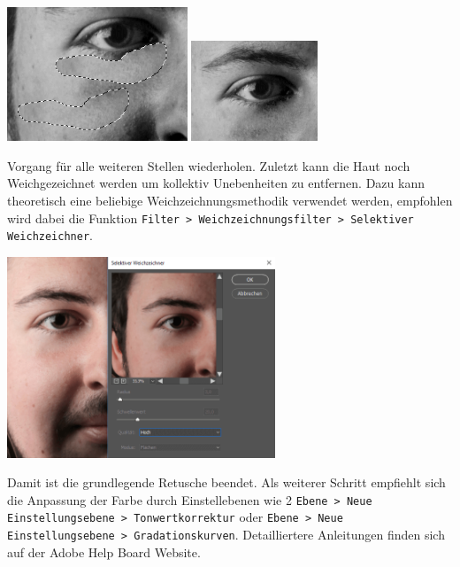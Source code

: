 \documentclass[notoc, landscape]{school}
\begin{document}
\begin{outline}[enumerate]
\includegraphics[height=4cm]{retusche-06-verbesserung.png}
\includegraphics[height=3cm]{retusche-07-verbessert.png}

		\3 Vorgang für alle weiteren Stellen wiederholen.
	\newpage
	\2 Zuletzt kann die Haut noch Weichgezeichnet werden um kollektiv Unebenheiten zu entfernen. Dazu kann theoretisch eine beliebige Weichzeichnungsmethodik verwendet werden, empfohlen wird dabei die Funktion \texttt{Filter > Weichzeichnungsfilter > Selektiver Weichzeichner}.

\includegraphics[height=6cm]{retusche-08-weich.png}

\1 
Damit ist die grundlegende Retusche beendet. Als weiterer Schritt empfiehlt sich die Anpassung der Farbe durch Einstellebenen wie 2 \texttt{Ebene > Neue Einstellungsebene > Tonwertkorrektur} oder \texttt{Ebene > Neue Einstellungsebene > Gradationskurven}. Detailliertere Anleitungen finden sich auf der Adobe Help Board Website\cite{adobe-levels}\cite{adobe-curves}.
\end{outline}
\end{document}
